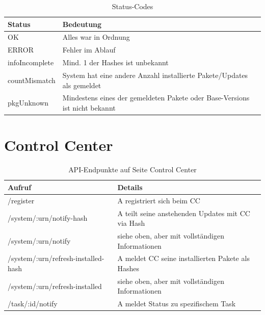 \begin{table}[H]
    \centering
    \caption{Status-Codes}
    \label{api:codes}
    \begin{tabular}{ll}
        \hline
        \textbf{Status} & \textbf{Bedeutung}                                                          \\ \hline
        OK              & Alles war in Ordnung                                                        \\
        ERROR           & Fehler im Ablauf                                                            \\
        infoIncomplete  & Mind. 1 der Hashes ist unbekannt                                            \\
        countMismatch   & System hat eine andere Anzahl installierte Pakete/Updates als gemeldet      \\
        pkgUnknown      & Mindestens eines der gemeldeten Pakete oder Base-Versions ist nicht bekannt \\ \hline
    \end{tabular}
\end{table}


\section*{Control Center}

\begin{table}[H]
    \centering
    \caption{API-Endpunkte auf Seite Control Center}
    \label{api:endpoints_cc}
    \begin{tabular}{ll}
        \hline
        \textbf{Aufruf}                     & \textbf{Details}                                  \\ \hline
        /register                           & A registriert sich beim CC                        \\
        /system/:urn/notify-hash            & A teilt seine anstehenden Updates mit CC via Hash \\
        /system/:urn/notify                 & siehe oben, aber mit vollständigen Informationen  \\
        /system/:urn/refresh-installed-hash & A meldet CC seine installierten Pakete als Hashes \\
        /system/:urn/refresh-installed      & siehe oben, aber mit vollständigen Informationen  \\
        /task/:id/notify                    & A meldet Status zu spezifischem Task              \\ \hline
    \end{tabular}
\end{table}

